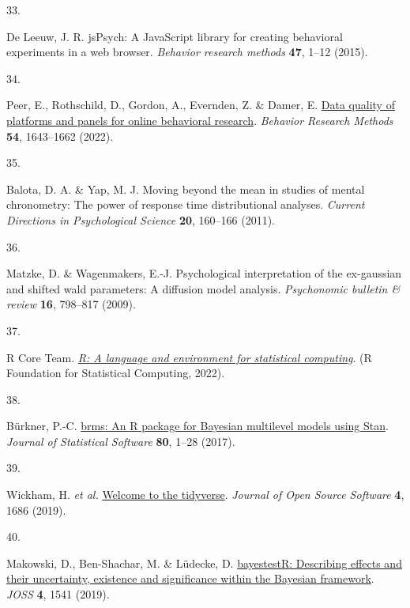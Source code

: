 \documentclass[
  man,floatsintext]{apa6}
\newlength{\cslhangindent}
\newlength{\csllabelwidth}
\newlength{\cslentryspacingunit} %
\newenvironment{CSLReferences}[2] %
 {%
  \setlength{\parindent}{0pt}
  \ifodd #1
  \let\oldpar\par
  \def\par{\hangindent=\cslhangindent\oldpar}
  \fi
  \setlength{\parskip}{#2\cslentryspacingunit}
 }%
 {}
\newcommand{\CSLLeftMargin}[1]{\parbox[t]{\csllabelwidth}{#1}}
\newcommand{\CSLRightInline}[1]{\parbox[t]{\linewidth - \csllabelwidth}{#1}\break}
\begin{document}
\begin{CSLReferences}{0}{0}
\leavevmode{}%
\CSLLeftMargin{33. }%
\CSLRightInline{De Leeuw, J. R. jsPsych: A JavaScript library for creating behavioral experiments in a web browser. \emph{Behavior research methods} \textbf{47}, 1--12 (2015).}

\leavevmode{}%
\CSLLeftMargin{34. }%
\CSLRightInline{Peer, E., Rothschild, D., Gordon, A., Evernden, Z. \& Damer, E. \href{https://doi.org/10.3758/s13428-021-01694-3}{Data quality of platforms and panels for online behavioral research}. \emph{Behavior Research Methods} \textbf{54}, 1643--1662 (2022).}

\leavevmode{}%
\CSLLeftMargin{35. }%
\CSLRightInline{Balota, D. A. \& Yap, M. J. Moving beyond the mean in studies of mental chronometry: The power of response time distributional analyses. \emph{Current Directions in Psychological Science} \textbf{20}, 160--166 (2011).}

\leavevmode{}%
\CSLLeftMargin{36. }%
\CSLRightInline{Matzke, D. \& Wagenmakers, E.-J. Psychological interpretation of the ex-gaussian and shifted wald parameters: A diffusion model analysis. \emph{Psychonomic bulletin \& review} \textbf{16}, 798--817 (2009).}

\leavevmode{}%
\CSLLeftMargin{37. }%
\CSLRightInline{R Core Team. \emph{\href{https://www.R-project.org/}{R: A language and environment for statistical computing}}. (R Foundation for Statistical Computing, 2022).}

\leavevmode{}%
\CSLLeftMargin{38. }%
\CSLRightInline{Bürkner, P.-C. \href{https://doi.org/10.18637/jss.v080.i01}{{brms}: An {R} package for {Bayesian} multilevel models using {Stan}}. \emph{Journal of Statistical Software} \textbf{80}, 1--28 (2017).}

\leavevmode{}%
\CSLLeftMargin{39. }%
\CSLRightInline{Wickham, H. \emph{et al.} \href{https://doi.org/10.21105/joss.01686}{Welcome to the tidyverse}. \emph{Journal of Open Source Software} \textbf{4}, 1686 (2019).}

\leavevmode{}%
\CSLLeftMargin{40. }%
\CSLRightInline{Makowski, D., Ben-Shachar, M. \& Lüdecke, D. \href{https://doi.org/10.21105/joss.01541}{{bayestestR}: Describing effects and their uncertainty, existence and significance within the {Bayesian} framework}. \emph{JOSS} \textbf{4}, 1541 (2019).}


\end{CSLReferences}
\end{document}

